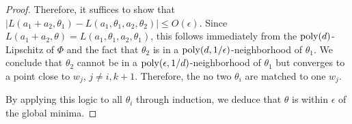 \begin{proof}
Therefore, it suffices to show that $|L(a_1+a_2,\theta_1) - L(a_1,\theta_1,a_2,\theta_2) | \leq O(\epsilon)$. Since $L(a_1+a_2,\theta) = L(a_1,\theta_1,a_2,\theta_1)$, this follows immediately from the $\mathrm{poly}(d)$-Lipschitz of $\Phi$ and the fact that $\theta_2$ is in a $\mathrm{poly}(d,1/\epsilon)$-neighborhood of $\theta_1$. We conclude that $\theta_2$ cannot be in a $\mathrm{poly}(\epsilon,1/d)$-neighborhood of $\theta_1$ but converges to a point close to $w_{j}$, $j\neq i,k+1$. Therefore, the no two $\theta_i$ are matched to one $w_j$. 

By applying this logic to all $\theta_i$ through induction, we deduce that $\theta$ is within $\epsilon$ of the global minima.
\end{proof}

